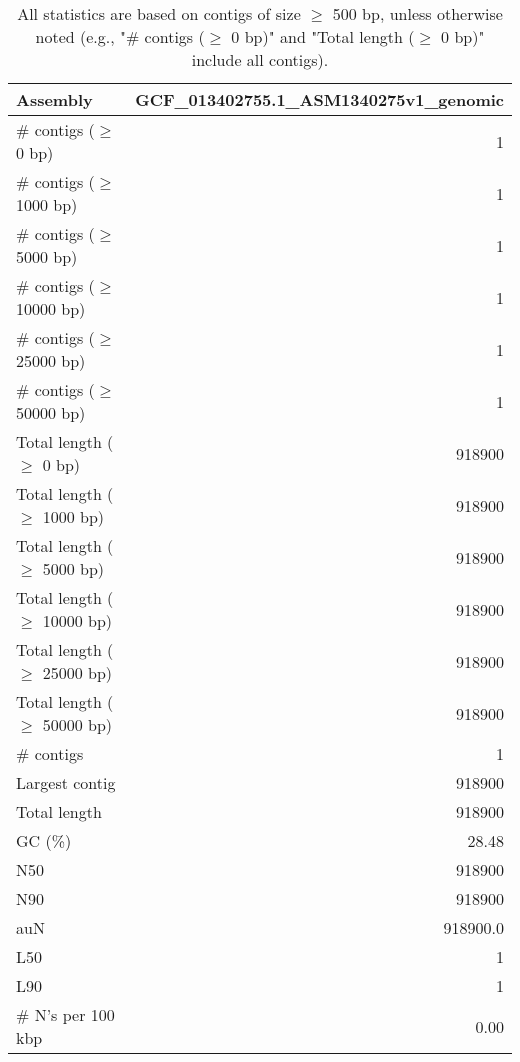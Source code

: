 \documentclass[12pt,a4paper]{article}
\begin{document}
\begin{table}[ht]
\begin{center}
\caption{All statistics are based on contigs of size $\geq$ 500 bp, unless otherwise noted (e.g., "\# contigs ($\geq$ 0 bp)" and "Total length ($\geq$ 0 bp)" include all contigs).}
\begin{tabular}{|l*{1}{|r}|}
\hline
Assembly & GCF\_013402755.1\_ASM1340275v1\_genomic \\ \hline
\# contigs ($\geq$ 0 bp) & 1 \\ \hline
\# contigs ($\geq$ 1000 bp) & 1 \\ \hline
\# contigs ($\geq$ 5000 bp) & 1 \\ \hline
\# contigs ($\geq$ 10000 bp) & 1 \\ \hline
\# contigs ($\geq$ 25000 bp) & 1 \\ \hline
\# contigs ($\geq$ 50000 bp) & 1 \\ \hline
Total length ($\geq$ 0 bp) & 918900 \\ \hline
Total length ($\geq$ 1000 bp) & 918900 \\ \hline
Total length ($\geq$ 5000 bp) & 918900 \\ \hline
Total length ($\geq$ 10000 bp) & 918900 \\ \hline
Total length ($\geq$ 25000 bp) & 918900 \\ \hline
Total length ($\geq$ 50000 bp) & 918900 \\ \hline
\# contigs & 1 \\ \hline
Largest contig & 918900 \\ \hline
Total length & 918900 \\ \hline
GC (\%) & 28.48 \\ \hline
N50 & 918900 \\ \hline
N90 & 918900 \\ \hline
auN & 918900.0 \\ \hline
L50 & 1 \\ \hline
L90 & 1 \\ \hline
\# N's per 100 kbp & 0.00 \\ \hline
\end{tabular}
\end{center}
\end{table}
\end{document}
